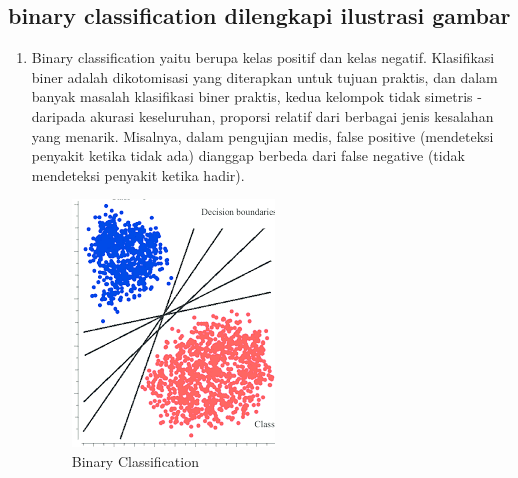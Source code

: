 \subsection{binary classification dilengkapi ilustrasi gambar}
\begin{enumerate}
\item Binary classification yaitu berupa kelas positif dan kelas negatif. Klasifikasi biner adalah dikotomisasi yang diterapkan untuk tujuan praktis, dan dalam banyak masalah klasifikasi biner praktis, kedua kelompok tidak simetris - daripada akurasi keseluruhan, proporsi relatif dari berbagai jenis kesalahan yang menarik. Misalnya, dalam pengujian medis, false positive (mendeteksi penyakit ketika tidak ada) dianggap berbeda dari false negative (tidak mendeteksi penyakit ketika hadir).
\begin{figure}[ht]
\centering
\includegraphics[scale=0.5]{figures/AFS/andri1.png}
\caption{Binary Classification}
\label{contoh}
\end{figure}
\end{enumerate}

